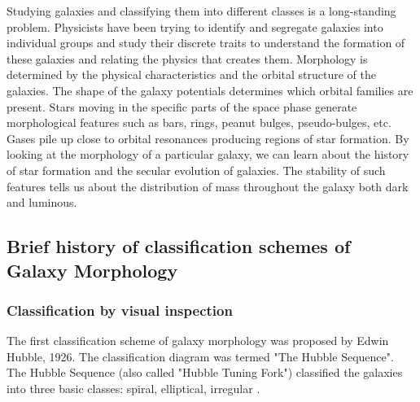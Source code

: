 \documentclass[fleqn,usenatbib]{mnras}
\begin{document}
\hspace{0.25 in}Studying galaxies and classifying them into different classes is a long-standing problem. Physicists have been trying to identify and segregate galaxies into individual groups and study their discrete traits to understand the formation of these galaxies and relating the physics that creates them. Morphology is determined by the physical characteristics and the orbital structure of the galaxies. The shape of the galaxy potentials determines which orbital families are present. Stars moving in the specific parts of the space phase generate morphological features such as bars, rings, peanut bulges, pseudo-bulges, etc. Gases pile up close to orbital resonances producing regions of star formation. By looking at the morphology of a particular galaxy, we can learn about the history of star formation and the secular evolution of galaxies. The stability of such features tells us about the distribution of mass throughout the galaxy both dark and luminous.


\subsection{Brief history of classification schemes of Galaxy Morphology}
\subsubsection{\textbf{Classification by visual inspection}}
\hspace{0.25 in}The first classification scheme of galaxy morphology was proposed by Edwin Hubble, 1926. The classification diagram was termed "The Hubble Sequence". The Hubble Sequence (also called "Hubble Tuning Fork") classified the galaxies into three basic classes: spiral, elliptical, irregular \citep{hubble1926extragalactic}.
\end{document}
